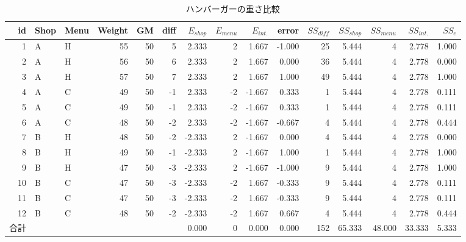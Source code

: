 \begin{landscape}
	\begin{table}[ht]
		\centering
		\caption{ハンバーガーの重さ比較}
		\begin{tabular}{rllrrrrrrrrrrrr}
			id & Shop & Menu & Weight & GM & diff & $E_{shop}$ & $E_{menu}$ & $E_{int.}$ & error  & $SS_{diff}$ & $SS_{shop}$ & $SS_{menu}$ & $SS_{int.}$ & $SS_{e}$ \\\hline\hline
			1  & A    & H    & 55     & 50 & 5    & 2.333      & 2          & 1.667      & -1.000 & 25          & 5.444       & 4           & 2.778       & 1.000    \\
			2  & A    & H    & 56     & 50 & 6    & 2.333      & 2          & 1.667      & 0.000  & 36          & 5.444       & 4           & 2.778       & 0.000    \\
			3  & A    & H    & 57     & 50 & 7    & 2.333      & 2          & 1.667      & 1.000  & 49          & 5.444       & 4           & 2.778       & 1.000    \\
			4  & A    & C    & 49     & 50 & -1   & 2.333      & -2         & -1.667     & 0.333  & 1           & 5.444       & 4           & 2.778       & 0.111    \\
			5  & A    & C    & 49     & 50 & -1   & 2.333      & -2         & -1.667     & 0.333  & 1           & 5.444       & 4           & 2.778       & 0.111    \\
			6  & A    & C    & 48     & 50 & -2   & 2.333      & -2         & -1.667     & -0.667 & 4           & 5.444       & 4           & 2.778       & 0.444    \\
			7  & B    & H    & 48     & 50 & -2   & -2.333     & 2          & -1.667     & 0.000  & 4           & 5.444       & 4           & 2.778       & 0.000    \\
			8  & B    & H    & 49     & 50 & -1   & -2.333     & 2          & -1.667     & 1.000  & 1           & 5.444       & 4           & 2.778       & 1.000    \\
			9  & B    & H    & 47     & 50 & -3   & -2.333     & 2          & -1.667     & -1.000 & 9           & 5.444       & 4           & 2.778       & 1.000    \\
			10 & B    & C    & 47     & 50 & -3   & -2.333     & -2         & 1.667      & -0.333 & 9           & 5.444       & 4           & 2.778       & 0.111    \\
			11 & B    & C    & 47     & 50 & -3   & -2.333     & -2         & 1.667      & -0.333 & 9           & 5.444       & 4           & 2.778       & 0.111    \\
			12 & B    & C    & 48     & 50 & -2   & -2.333     & -2         & 1.667      & 0.667  & 4           & 5.444       & 4           & 2.778       & 0.444    \\\hline
			合計 &      &      &        &    &      & 0.000      & 0          & 0.000      & 0.000  & 152         & 65.333      & 48.000      & 33.333      & 5.333    \\\hline
		\end{tabular}
		\label{anovaExample2}
	\end{table}
\end{landscape}

